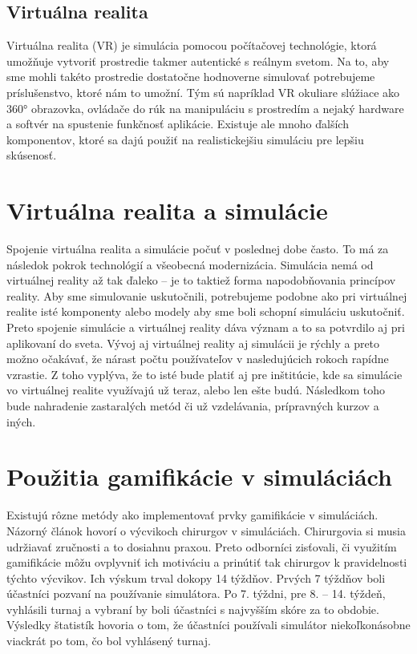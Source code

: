\documentclass[10pt,slovak,a4paper]{article}
\begin{document}
\subsection{Virtuálna realita} \label{Gamification:virtual_reality}

Virtuálna realita (VR) je simulácia pomocou počítačovej technológie, ktorá umožňuje vytvoriť prostredie takmer autentické s reálnym svetom. Na to, aby sme mohli takéto prostredie dostatočne hodnoverne simulovať potrebujeme príslušenstvo, ktoré nám to umožní. Tým sú napríklad VR okuliare slúžiace ako 360° obrazovka, ovládače do rúk na manipuláciu s prostredím a nejaký hardware a softvér na spustenie funkčnosť aplikácie. Existuje ale mnoho ďalších komponentov, ktoré sa dajú použiť na realistickejšiu simuláciu pre lepšiu skúsenosť. 


\section{Virtuálna realita a simulácie} \label{Simulations}

Spojenie virtuálna realita a simulácie počuť v poslednej dobe často. To má za následok pokrok technológií a všeobecná modernizácia. Simulácia nemá od virtuálnej reality až tak ďaleko – je to taktiež forma napodobňovania princípov reality. Aby sme simulovanie uskutočnili, potrebujeme podobne ako pri virtuálnej realite isté komponenty alebo modely aby sme boli schopní simuláciu uskutočniť. Preto spojenie simulácie a virtuálnej reality dáva význam a to sa potvrdilo aj pri aplikovaní do sveta. Vývoj aj virtuálnej reality aj simulácii je rýchly a preto možno očakávať, že nárast počtu používateľov v nasledujúcich rokoch rapídne vzrastie. Z toho vyplýva, že to isté bude platiť aj pre inštitúcie, kde sa simulácie vo virtuálnej realite využívajú už teraz, alebo len ešte budú. Následkom toho bude nahradenie zastaralých metód či už vzdelávania, prípravných kurzov a iných. 


\section{Použitia gamifikácie v simuláciách} \label{Uses}

Existujú rôzne metódy ako implementovať prvky gamifikácie v simuláciách. Názorný článok \cite{Kerfoot2014} hovorí o výcvikoch chirurgov v simuláciách. Chirurgovia si musia udržiavať zručnosti a to dosiahnu praxou. Preto odborníci zisťovali, či využitím gamifikácie môžu ovplyvniť ich motiváciu a prinútiť tak chirurgov k pravidelnosti týchto výcvikov. Ich výskum trval  dokopy 14 týždňov. Prvých 7 týždňov boli účastníci pozvaní na používanie simulátora. Po 7. týždni, pre 8. – 14. týždeň, vyhlásili turnaj a vybraní by boli účastníci s najvyšším skóre za to obdobie. Výsledky štatistík hovoria o tom, že účastníci používali simulátor niekoľkonásobne viackrát po tom, čo bol vyhlásený turnaj. 
\end{document}
